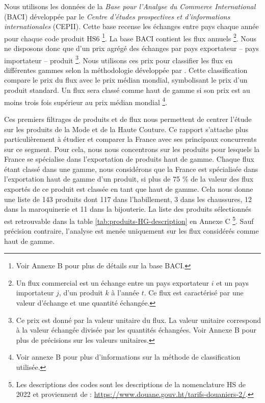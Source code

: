 \documentclass[french,10pt,a4paper]{article}
\begin{document}
Nous utilisons les données de la \textit{Base pour l'Analyse du Commerce International} (BACI) \citep{Gaulier2010} développée par le \textit{Centre d'études prospectives et d'informations internationales} (CEPII). Cette base recense les échanges entre pays chaque année pour chaque code produit HS6 \footnote{Voir Annexe B pour plus de détails sur la base BACI.}. La base BACI contient les flux annuels \footnote{Un flux commercial est un échange entre un pays exportateur $i$ et un pays importateur $j$, d'un produit $k$ à l'année $t$. Ce flux est caractérisé par une valeur d'échange et une quantité échangée.}. Nous ne disposons donc que d'un \og prix\fg{} agrégé des échanges par pays exportateur – pays importateur – produit \footnote{Ce \og prix\fg{} est donné par la valeur unitaire du flux. La valeur unitaire correspond à la valeur échangée divisée par les quantités échangées. Voir Annexe B pour plus de précisions sur les valeurs unitaires.}. Nous utilisons ces prix pour classifier les flux en différentes gammes selon la méthodologie développée par \cite{Fontagne1997}. Cette classification compare le prix du flux avec le prix médian mondial, symbolisant le prix d'un produit standard. Un flux sera classé comme haut de gamme si son prix est au moins trois fois supérieur au prix médian mondial \footnote{Voir annexe B pour plus d'informations sur la méthode de classification utilisée.}.

\bigskip

Ces premiers filtrages de produits et de flux nous permettent de centrer l'étude sur les produits de la Mode et de la Haute Couture. Ce rapport s'attache plus particulièrement à étudier et comparer la France avec ses principaux concurrents sur ce segment. Pour cela, nous nous concentrons sur les produits pour lesquels la France se spécialise dans l'exportation de produits haut de gamme. Chaque flux étant classé dans une gamme, nous considérons que la France est spécialisée dans l'exportation haut de gamme d'un produit, si plus de 75 \% de la valeur des flux exportés de ce produit est classée en tant que haut de gamme. Cela nous donne une liste de 143 produits dont 117 dans l'habillement, 3 dans les chaussures, 12 dans la maroquinerie et 11 dans la bijouterie. La liste des produits sélectionnés est retrouvable dans la table \ref{tab:produits-HG-description} en Annexe C \footnote{Les descriptions des codes sont les descriptions de la nomenclature HS de 2022 et proviennent de : \href{https://www.douane.gouv.ht/tarifs-douaniers-2/}{https://www.douane.gouv.ht/tarifs-douaniers-2/}.}. Sauf précision contraire, l'analyse est menée uniquement sur les flux considérés comme haut de gamme.
\end{document}
